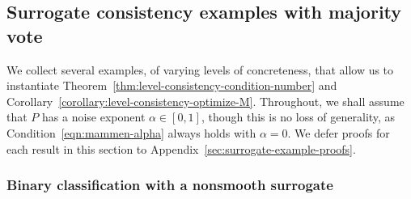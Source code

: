 \documentclass[11pt]{article}
\begin{document}



\subsection{Surrogate consistency examples with majority vote} \label{sec:surrogate-example}

We collect several examples, of varying levels of concreteness, that allow
us to instantiate Theorem~\ref{thm:level-consistency-condition-number} and
Corollary~\ref{corollary:level-consistency-optimize-M}.
%
Throughout, we shall assume that $P$ has a noise exponent $\alpha \in [0,
  1]$, though this is no loss of generality, as
Condition~\eqref{eqn:mammen-alpha} always holds with $\alpha = 0$.
\noindent
We defer proofs for each result in this section
to Appendix~\ref{sec:surrogate-example-proofs}.

\subsubsection{Binary classification with a nonsmooth surrogate}
\end{document}
